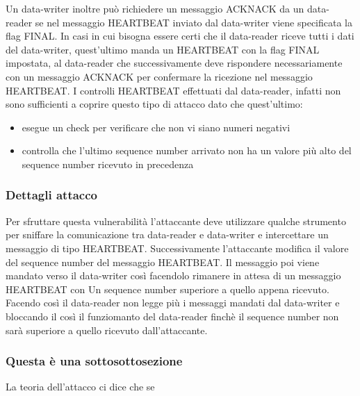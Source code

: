 Un data-writer inoltre può richiedere un messaggio ACKNACK da un data-reader se 
nel messaggio HEARTBEAT inviato dal data-writer viene specificata la flag FINAL.
In casi in cui bisogna essere certi che il data-reader riceve tutti i dati del
data-writer, quest'ultimo manda un HEARTBEAT con la flag FINAL impostata, al
data-reader che successivamente deve rispondere necessariamente con un messaggio
ACKNACK per confermare la ricezione nel messaggio HEARTBEAT.
I controlli HEARTBEAT effettuati dal data-reader,
infatti non sono sufficienti a coprire questo tipo di attacco
dato che quest'ultimo:
\begin{itemize}
    \item esegue un check per verificare che non vi siano numeri negativi
    \item controlla che l'ultimo sequence number arrivato non ha un valore più alto 
    del sequence number ricevuto in precedenza 
\end{itemize}
\subsubsection{Dettagli attacco}
Per sfruttare questa vulnerabilità l'attaccante deve utilizzare qualche strumento
per sniffare la comunicazione tra data-reader e data-writer e intercettare un
messaggio di tipo HEARTBEAT. Successivamente l'attaccante modifica il valore del
sequence number del messaggio HEARTBEAT. Il messaggio poi viene mandato verso il
data-writer così facendolo rimanere in attesa di un messaggio HEARTBEAT con Un
sequence number superiore a quello appena ricevuto. Facendo così il data-reader
non legge più i messaggi mandati dal data-writer e bloccando il così
il funziomanto del data-reader finchè il sequence number non
sarà superiore a quello ricevuto dall'attaccante.


\subsubsection{Questa è una sottosottosezione}
La teoria dell'attacco ci dice che se 


\setlength{\arrayrulewidth}{1.0pt} %


